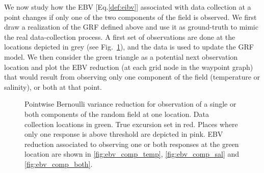 \documentclass[aoas]{imsart}
\begin{document}
We now study how the EBV [Eq.\eqref{def:eibv}] associated with data
collection at a point changes if only one of the two components of the
field is observed. We first draw a realization of the GRF defined
above and use it as ground-truth to mimic the real data-collection
process. A first set of observations are done at the locations
depicted in grey (see Fig.~\ref{fig:ebv_comp}), and the data is used
to update the GRF model. We then consider the green triangle as a
potential next observation location and plot the EBV reduction (at
each grid node in the waypoint graph) that would result from observing
only one component of the field (temperature or salinity), or both at
that point.

\begin{figure}[!b] 
\centering 
{}
\caption{Pointwise Bernoulli variance reduction for observation of a
  single or both components of the random field at one location. Data
  collection locations in green. True excursion set in red. Places
  where only one response is above threshold are depicted in pink. EBV
  reduction associated to observing one or both responses at the green
  location are shown in \ref{fig:ebv_comp_temp},
  \ref{fig:ebv_comp_sal} and \ref{fig:ebv_comp_both}.}
\label{fig:ebv_comp}
\end{figure}
\end{document}

